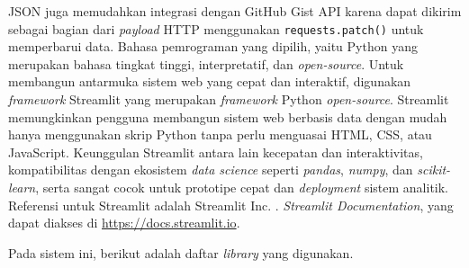 \begin{enumerate}
    JSON juga memudahkan integrasi dengan GitHub Gist API karena dapat dikirim sebagai bagian dari \textit{payload} HTTP menggunakan \texttt{requests.patch()} untuk memperbarui data. Bahasa pemrograman yang dipilih, yaitu Python yang merupakan bahasa tingkat tinggi, interpretatif, dan \textit{open-source}. Untuk membangun antarmuka sistem web yang cepat dan interaktif, digunakan \textit{framework} Streamlit yang merupakan \textit{framework} Python \textit{open-source}. Streamlit memungkinkan pengguna membangun sistem web berbasis data dengan mudah hanya menggunakan skrip Python tanpa perlu menguasai HTML, CSS, atau JavaScript. Keunggulan Streamlit antara lain kecepatan dan interaktivitas, kompatibilitas dengan ekosistem \textit{data science} seperti \textit{pandas}, \textit{numpy}, dan \textit{scikit-learn}, serta sangat cocok untuk prototipe cepat dan \textit{deployment} sistem analitik. Referensi untuk Streamlit adalah Streamlit Inc.  \cite{streamlit_docs}. \textit{Streamlit Documentation}, yang dapat diakses di \url{https://docs.streamlit.io}.

    Pada sistem \textit{} ini, berikut adalah daftar \textit{library} yang digunakan.
    

\end{enumerate}
